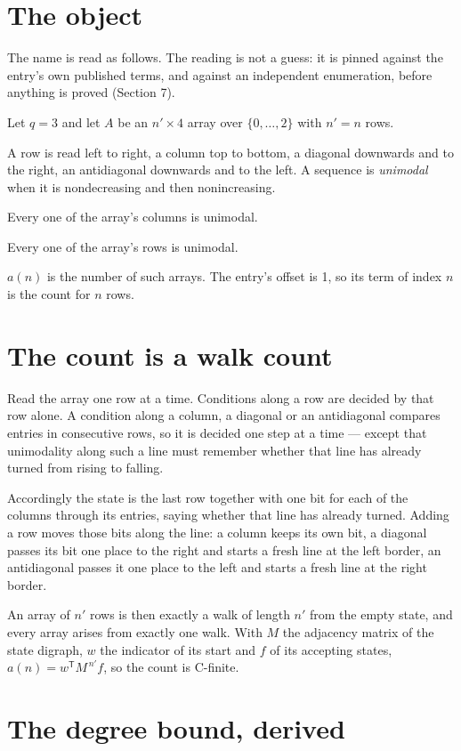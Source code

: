 \documentclass[11pt]{article}
\theoremstyle{definition}
\begin{document}
\section{The object}

The name is read as follows. The reading is not a guess: it is pinned against the entry's own published terms, and against an independent enumeration, before anything is proved (Section 7).

Let $q = 3$ and let $A$ be an $n' \times 4$ array over $\{0,\dots,2\}$ with $n' = n$ rows.

A row is read left to right, a column top to bottom, a diagonal downwards and to the right, an antidiagonal downwards and to the left. A sequence is {\itshape unimodal} when it is nondecreasing and then nonincreasing.

Every one of the array's columns is unimodal.

Every one of the array's rows is unimodal.

$a(n)$ is the number of such arrays. The entry's offset is 1, so its term of index $n$ is the count for $n$ rows.

\section{The count is a walk count}

Read the array one row at a time. Conditions along a row are decided by that row alone. A condition along a column, a diagonal or an antidiagonal compares entries in consecutive rows, so it is decided one step at a time --- except that unimodality along such a line must remember whether that line has already turned from rising to falling.

Accordingly the state is the last row together with one bit for each of the columns through its entries, saying whether that line has already turned. Adding a row moves those bits along the line: a column keeps its own bit, a diagonal passes its bit one place to the right and starts a fresh line at the left border, an antidiagonal passes it one place to the left and starts a fresh line at the right border.

An array of $n'$ rows is then exactly a walk of length $n'$ from the empty state, and every array arises from exactly one walk. With $M$ the adjacency matrix of the state digraph, $w$ the indicator of its start and $f$ of its accepting states, $a(n) = w^{\mathsf T}M^{\,n'}f$, so the count is C-finite.

\section{The degree bound, derived}
\end{document}
